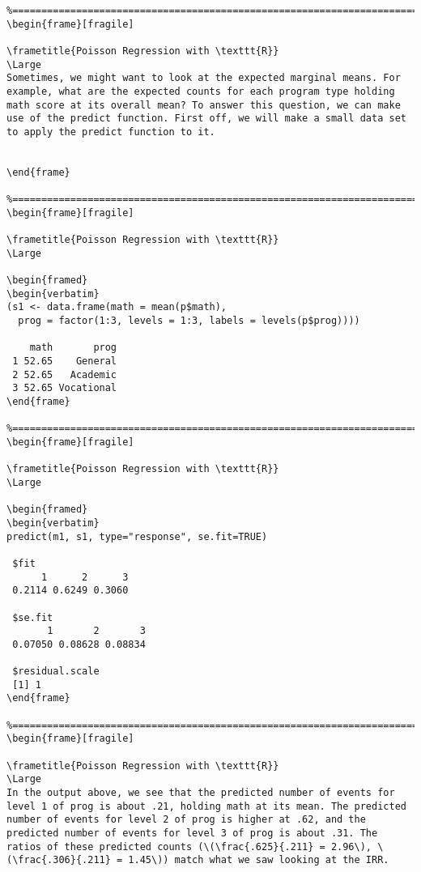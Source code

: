 \begin{frame}[fragile]
\begin{framed}
\begin{verbatim}
%================================================================================================%
\begin{frame}[fragile]

\frametitle{Poisson Regression with \texttt{R}}
\Large
Sometimes, we might want to look at the expected marginal means. For example, what are the expected counts for each program type holding math score at its overall mean? To answer this question, we can make use of the predict function. First off, we will make a small data set to apply the predict function to it.


\end{frame}

%================================================================================================%
\begin{frame}[fragile]

\frametitle{Poisson Regression with \texttt{R}}
\Large

\begin{framed}
\begin{verbatim}
(s1 <- data.frame(math = mean(p$math),
  prog = factor(1:3, levels = 1:3, labels = levels(p$prog))))
 
    math       prog
 1 52.65    General
 2 52.65   Academic
 3 52.65 Vocational
\end{frame}

%================================================================================================%
\begin{frame}[fragile]

\frametitle{Poisson Regression with \texttt{R}}
\Large 

\begin{framed}
\begin{verbatim}
predict(m1, s1, type="response", se.fit=TRUE)
 
 $fit
      1      2      3 
 0.2114 0.6249 0.3060 
 
 $se.fit
       1       2       3 
 0.07050 0.08628 0.08834 
 
 $residual.scale
 [1] 1
\end{frame}

%================================================================================================%
\begin{frame}[fragile]

\frametitle{Poisson Regression with \texttt{R}}
\Large 
In the output above, we see that the predicted number of events for level 1 of prog is about .21, holding math at its mean. The predicted number of events for level 2 of prog is higher at .62, and the predicted number of events for level 3 of prog is about .31. The ratios of these predicted counts (\(\frac{.625}{.211} = 2.96\), \(\frac{.306}{.211} = 1.45\)) match what we saw looking at the IRR.


\end{verbatim}
\end{framed}
\end{frame}
